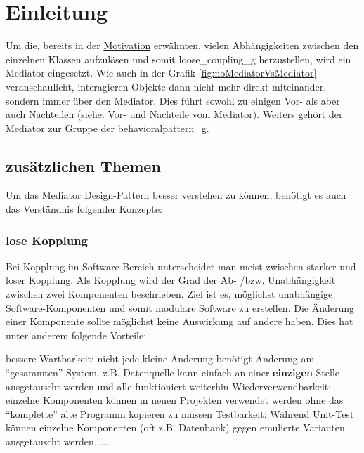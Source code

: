 
\chapter{Einleitung}
Um die, bereits in der \hyperref[ref:motivation]{Motivation} erwähnten, vielen Abhängigkeiten zwischen den einzelnen Klassen aufzulösen und somit \gls{loose_coupling_g} herzustellen, wird ein Mediator eingesetzt. Wie auch in der Grafik \ref{fig:noMediatorVsMediator} veranschaulicht, interagieren Objekte dann nicht mehr direkt miteinander, sondern immer über den Mediator. Dies führt sowohl zu einigen Vor- als aber auch Nachteilen (siehe: \hyperref[ref:vorteileNachteile]{Vor- und Nachteile vom Mediator}). Weiters gehört der Mediator zur Gruppe der \gls{behavioralpattern_g}.
\autocite[vgl.][S. 273ff]{gangoffour_book}
%
\section{zusätzlichen Themen}
Um das Mediator Design-Pattern besser verstehen zu können, benötigt es auch das Verständnis folgender Konzepte:
\subsection{lose Kopplung}\label{ref:looseCoupling}
Bei Kopplung im Software-Bereich unterscheidet man meist zwischen starker und loser Kopplung. Als Kopplung wird der Grad der Ab- /bzw. Unabhängigkeit zwischen zwei Komponenten beschrieben. Ziel ist es, möglichst unabhängige Software-Komponenten und somit modulare Software zu erstellen. Die Änderung einer Komponente sollte möglichst keine Auswirkung auf andere haben. Dies hat unter anderem folgende Vorteile: 
\begin{outline}\label{ref:prosLoseKopplung}
    \1 bessere Wartbarkeit: nicht jede kleine Änderung benötigt Änderung am \enquote{gesammten} System. z.B. Datenquelle kann einfach an einer \textbf{einzigen} Stelle ausgetauscht werden und alle funktioniert weiterhin
    \1 Wiederverwendbarkeit: einzelne Komponenten können in neuen Projekten verwendet werden ohne das \enquote{komplette} alte Programm kopieren zu müssen
    \1 Testbarkeit: Während Unit-Test können einzelne Komponenten (oft z.B. Datenbank) gegen emulierte Varianten ausgetauscht werden.
    \1 ...
\end{outline}

